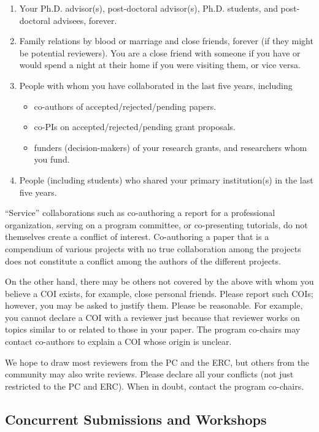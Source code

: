 \documentclass[pageno]{jpaper}
\begin{document}
\begin{enumerate}
\item Your Ph.D. advisor(s), post-doctoral advisor(s), Ph.D. students,
      and post-doctoral advisees, forever.
\item Family relations by blood or marriage and close friends, forever (if they might be potential reviewers). You are a close friend with someone if you have or would spend a night at their home if you were visiting them, or vice versa.
\item People with whom you have collaborated in the last five  years, including
\begin{itemize}
\item co-authors of accepted/rejected/pending papers.
\item co-PIs on accepted/rejected/pending grant proposals.
\item funders (decision-makers) of your research grants, and researchers
      whom you fund.
\end{itemize}
\item People (including students) who shared your primary institution(s) in the
last five years.
\end{enumerate}

``Service'' collaborations such as co-authoring a report for a professional
organization, serving on a program committee, or co-presenting
tutorials, do not themselves create a conflict of interest.
Co-authoring a paper that is a compendium of various projects with
no true collaboration among the projects does not constitute a
conflict among the authors of the different projects.

On the other hand, there may be others not covered by the above with whom
you believe a COI exists, for example, close personal friends.
Please report such COIs; however, you may be asked to justify them.
Please be reasonable.	For example, you cannot declare a COI with a
reviewer just because that reviewer works on topics similar to or
related to those in your paper.
The program co-chairs may contact co-authors to explain a COI whose origin is unclear.

We hope to draw most reviewers from the PC and the ERC, but others from the
community may also write reviews.  Please declare all your conflicts (not
just restricted to the PC and ERC).  When in doubt, contact the program
co-chairs.

\subsection{Concurrent Submissions and Workshops}
\end{document}

